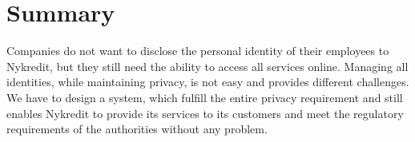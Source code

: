 \section{Summary}
Companies do not want to disclose the personal identity of their employees to Nykredit, but they still need the ability to access all services online. Managing all identities, while maintaining privacy, is not easy and provides different challenges. We have to design a system, which fulfill the entire privacy requirement and still enables Nykredit to provide its services to its customers and meet the regulatory requirements of the authorities without any problem.

